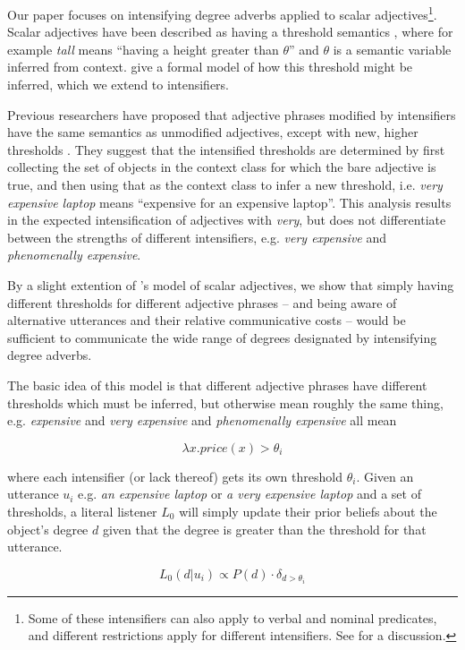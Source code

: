 \documentclass[10pt,letterpaper]{article}
\newcommand{\w}[1]{\emph{#1}}
\begin{document}
Our paper focuses on intensifying degree adverbs applied to scalar adjectives\footnote{Some of these intensifiers can also apply to verbal and nominal predicates, and different restrictions apply for different intensifiers. See \cite{bolinger} for a discussion.}. Scalar adjectives have been described as having a threshold semantics \cite{kennedy}, where for example \w{tall} means ``having a height greater than $\theta$'' and $\theta$ is a semantic variable inferred from context.  give a formal model of how this threshold might be inferred, which we extend to intensifiers.

Previous researchers have proposed that adjective phrases modified by intensifiers have the same semantics as unmodified adjectives, except with new, higher thresholds \cite{klein, kennedyMcnally, wheeler}. They suggest that the intensified thresholds are determined by first collecting the set of objects in the context class for which the bare adjective is true, and then using that as the context class to infer a new threshold, i.e. \w{very expensive laptop} means ``expensive for an expensive laptop''. This analysis results in the expected intensification of adjectives with \w{very}, but does not differentiate between the strengths of different intensifiers, e.g. \w{very expensive} and \w{phenomenally expensive}.

By a slight extention of 's model of scalar adjectives, we show that simply having different thresholds for different adjective phrases -- and being aware of alternative utterances and their relative communicative costs -- would be sufficient to communicate the wide range of degrees designated by intensifying degree adverbs.

The basic idea of this model is that different adjective phrases have different thresholds which must be inferred, but otherwise mean roughly the same thing, e.g. \w{expensive} and \w{very expensive} and \w{phenomenally expensive} all mean

\[ \lambda x . price(x) > \theta_i \]

where each intensifier (or lack thereof) gets its own threshold $\theta_i$.
Given an utterance $u_i$ e.g. \w{an expensive laptop} or \w{a very expensive laptop} and a set of thresholds, a literal listener $L_0$ will simply update their prior beliefs about the object's degree $d$ given that the degree is greater than the threshold for that utterance.

\[ L_0(d | u_i) \propto P(d) \cdot \delta_{d > \theta_i} \]
\end{document}
